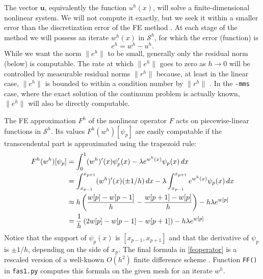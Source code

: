 \documentclass[letterpaper,final,12pt,reqno]{amsart}
\newcommand{\bu}{\mathbf{u}}
\begin{document}
The vector $\bu$, equivalently the function $u^h(x)$, will solve a finite-dimensional nonlinear system.  We will not compute it exactly, but we seek it within a smaller error than the discretization error of the FE method \cite{Elmanetal2014}.  At each stage of the method we will possess an iterate $w^h(x)$ in $\mathcal{S}^h$, for which the error (function) is
\begin{equation}
  e^h = w^h - u^h.  \label{feerror}
\end{equation}
While we want the norm $\|e^h\|$ to be small, generally only the residual norm (below) is computable.  The rate at which $\|e^h\|$ goes to zero as $h\to 0$ will be controlled by measurable residual norms $\|r^h\|$ because, at least in the linear case, $\|e^h\|$ is bounded to within a condition number by $\|r^h\|$ \cite[Chapter 2]{Bueler2021}.  In the \texttt{-mms} case, where the exact solution of the continuum problem is actually known, $\|e^h\|$ will also be directly computable.

The FE approximation $F^h$ of the nonlinear operator $F$ acts on piecewise-linear functions in $\mathcal{S}^h$.  Its values $F^h(w^h)[\psi_p]$ are easily computable if the transcendental part is approximated using the trapezoid rule:
\begin{align}
  F^h(w^h)[\psi_p] &= \int_0^1 (w^h)'(x) \psi_p'(x) - \lambda e^{w^h(x)} \psi_p(x)\, dx  \label{feoperator} \\
    &= \int_{x_{p-1}}^{x_{p+1}} (w^h)'(x) (\pm 1/h)\,dx - \lambda \int_{x_{p-1}}^{x_{p+1}} e^{w^h(x)} \psi_p(x)\, dx \notag \\
    &\approx h \left(\frac{w[p]-w[p-1]}{h} - \frac{w[p+1]-w[p]}{h}\right) - h \lambda e^{w[p]}  \notag \\
    &= \frac{1}{h}\left(2w[p]-w[p-1]-w[p+1]\right) - h \lambda e^{w[p]} \notag
\end{align}
Notice that the support of $\psi_p(x)$ is $[x_{p-1},x_{p+1}]$ and that the derivative of $\psi_p$ is $\pm 1/h$, depending on the side of $x_p$.  The final formula in \eqref{feoperator} is a rescaled version of a well-known $O(h^2)$ finite difference scheme \cite[Chapter 3]{Bueler2021}.  Function \texttt{FF()} in \texttt{fas1.py} computes this formula on the given mesh for an iterate $w^h$.
\end{document}
